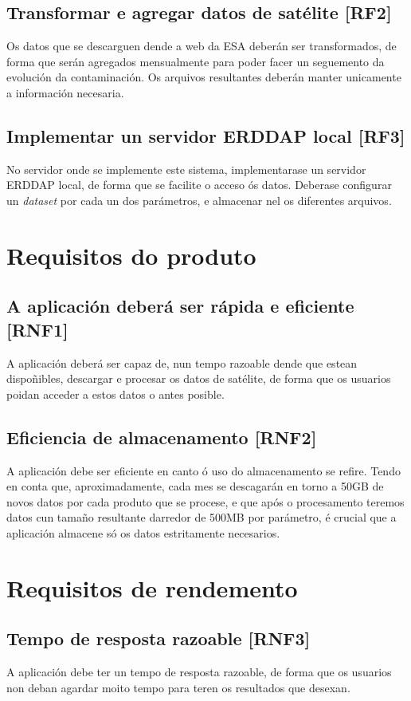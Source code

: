 \subsection{Transformar e agregar datos de satélite [RF2]}\label{rf2}
Os datos que se descarguen dende a web da ESA deberán ser transformados, de forma que serán agregados mensualmente para poder facer un
seguemento da evolución da contaminación. Os arquivos resultantes deberán manter unicamente a información necesaria.

\subsection{Implementar un servidor ERDDAP local [RF3]}\label{rf3}
No servidor onde se implemente este sistema, implementarase un servidor ERDDAP local, de forma que se facilite o acceso ós datos. Deberase
configurar un \textit{dataset} por cada un dos parámetros, e almacenar nel os diferentes arquivos.


\section{Requisitos do produto}
\subsection{A aplicación deberá ser rápida e eficiente [RNF1]}\label{rnf1}
A aplicación deberá ser capaz de, nun tempo razoable dende que estean dispoñibles, descargar e procesar os datos de satélite, de forma que
os usuarios poidan acceder a estos datos o antes posible.

\subsection{Eficiencia de almacenamento [RNF2]}\label{rnf2}
A aplicación debe ser eficiente en canto ó uso do almacenamento se refire. Tendo en conta que, aproximadamente, cada mes se descagarán en torno
a 50GB de novos datos por cada produto que se procese, e que após o procesamento teremos datos cun tamaño resultante darredor de 500MB por
parámetro, é crucial que a aplicación almacene só os datos estritamente necesarios.

\section{Requisitos de rendemento}
\subsection{Tempo de resposta razoable [RNF3]}\label{rnf3}
A aplicación debe ter un tempo de resposta razoable, de forma que os usuarios non deban agardar moito tempo para teren os resultados que desexan.